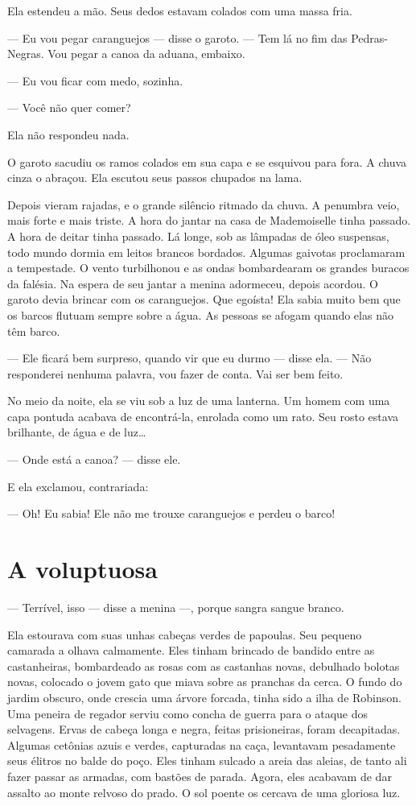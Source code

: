 Ela estendeu a mão. Seus dedos estavam colados com uma massa fria.

--- Eu vou pegar caranguejos --- disse o garoto. --- Tem lá no fim das
Pedras-Negras. Vou pegar a canoa da aduana, embaixo.

--- Eu vou ficar com medo, sozinha.

--- Você não quer comer?

Ela não respondeu nada.

O garoto sacudiu os ramos colados em sua capa e se esquivou para fora.
A chuva cinza o abraçou. Ela escutou seus passos chupados na lama.

Depois vieram rajadas, e o grande silêncio ritmado da chuva. A penumbra
veio, mais forte e mais triste. A hora do jantar na casa de Mademoiselle
tinha passado. A hora de deitar tinha passado. Lá longe, sob as lâmpadas
de óleo suspensas, todo mundo dormia em leitos brancos bordados. Algumas
gaivotas proclamaram a tempestade. O vento turbilhonou e as ondas
bombardearam os grandes buracos da falésia. Na espera de seu jantar a
menina adormeceu, depois acordou. O garoto devia brincar com os
caranguejos. Que egoísta! Ela sabia muito bem que os barcos flutuam
sempre sobre a água. As pessoas se afogam quando elas não têm barco.

--- Ele ficará bem surpreso, quando vir que eu durmo --- disse ela. --- Não
responderei nenhuma palavra, vou fazer de conta. Vai ser bem feito.

No meio da noite, ela se viu sob a luz de uma lanterna. Um homem com
uma capa pontuda acabava de encontrá-la, enrolada como um rato. Seu rosto
estava brilhante, de água e de luz\ldots{}

--- Onde está a canoa? --- disse ele.

E ela exclamou, contrariada:

--- Oh! Eu sabia! Ele não me trouxe caranguejos e perdeu o barco!

\section{A voluptuosa}

--- Terrível, isso --- disse a menina ---, porque sangra sangue branco.

Ela estourava com suas unhas cabeças verdes de papoulas. Seu pequeno
camarada a olhava calmamente. Eles tinham brincado de bandido entre as
castanheiras, bombardeado as rosas com as castanhas novas, debulhado
bolotas novas, colocado o jovem gato que miava sobre as pranchas da cerca.
O fundo do jardim obscuro, onde crescia uma árvore forcada, tinha sido a
ilha de Robinson. Uma peneira de regador serviu como concha de guerra para
o ataque dos selvagens. Ervas de cabeça longa e negra, feitas
prisioneiras, foram decapitadas. Algumas cetônias azuis e verdes,
capturadas na caça, levantavam pesadamente seus élitros no balde do poço.
Eles tinham sulcado a areia das aleias, de tanto ali fazer passar as
armadas, com bastões de parada. Agora, eles acabavam de dar assalto ao
monte relvoso do prado. O sol poente os cercava de uma gloriosa luz.

